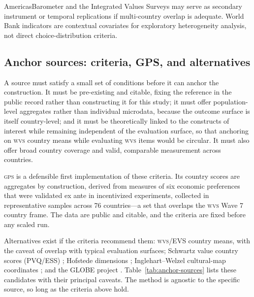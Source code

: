 \documentclass[10pt,letterpaper]{article}
\newcommand{\WVS}{\textsc{wvs}}
\newcommand{\GPS}{\textsc{gps}}
\begin{document}
AmericasBarometer and the Integrated Values Surveys may serve as secondary instrument or temporal replications if multi-country overlap is adequate. World Bank indicators are contextual covariates for exploratory heterogeneity analysis, not direct choice-distribution criteria.

\subsection{Anchor sources: criteria, GPS, and alternatives}

A source must satisfy a small set of conditions before it can anchor the construction. It must be pre-existing and citable, fixing the reference in the public record rather than constructing it for this study; it must offer population-level aggregates rather than individual microdata, because the outcome surface is itself country-level; and it must be theoretically linked to the constructs of interest while remaining independent of the evaluation surface, so that anchoring on \WVS{} country means while evaluating \WVS{} items would be circular. It must also offer broad country coverage and valid, comparable measurement across countries.

\GPS{} is a defensible first implementation of these criteria. Its country scores are aggregates by construction, derived from measures of six economic preferences that were validated ex ante in incentivized experiments, collected in representative samples across 76 countries---a set that overlaps the \WVS{} Wave 7 country frame. The data are public and citable, and the criteria are fixed before any scaled run.

Alternatives exist if the criteria recommend them: \WVS{}/EVS country means, with the caveat of overlap with typical evaluation surfaces; Schwartz value country scores (PVQ/ESS) \cite{schwartz1992}; Hofstede dimensions \cite{hofstede2010}; Inglehart--Welzel cultural-map coordinates \cite{inglehart2005}; and the GLOBE project \cite{globe2004}. Table~\ref{tab:anchor-sources} lists these candidates with their principal caveats. The method is agnostic to the specific source, so long as the criteria above hold.
\end{document}
